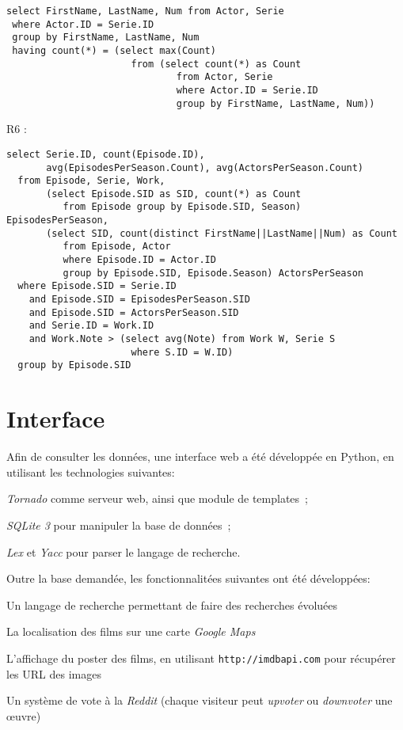 \documentclass[a4paper,12pt]{article}
\begin{document}
\begin{list}{-}{}
\begin{lstlisting}
select FirstName, LastName, Num from Actor, Serie
 where Actor.ID = Serie.ID
 group by FirstName, LastName, Num
 having count(*) = (select max(Count)
                      from (select count(*) as Count
                              from Actor, Serie
                              where Actor.ID = Serie.ID
                              group by FirstName, LastName, Num))
    \end{lstlisting}
  \item R6 :
    \begin{lstlisting}
select Serie.ID, count(Episode.ID),
       avg(EpisodesPerSeason.Count), avg(ActorsPerSeason.Count)
  from Episode, Serie, Work,
       (select Episode.SID as SID, count(*) as Count
          from Episode group by Episode.SID, Season) EpisodesPerSeason,
       (select SID, count(distinct FirstName||LastName||Num) as Count
          from Episode, Actor
          where Episode.ID = Actor.ID
          group by Episode.SID, Episode.Season) ActorsPerSeason
  where Episode.SID = Serie.ID
    and Episode.SID = EpisodesPerSeason.SID
    and Episode.SID = ActorsPerSeason.SID
    and Serie.ID = Work.ID
    and Work.Note > (select avg(Note) from Work W, Serie S
                      where S.ID = W.ID)
  group by Episode.SID
\end{lstlisting}
\section{Interface}
Afin de consulter les données, une interface web a été développée en
Python, en utilisant les technologies suivantes:
\begin{list}{-}{}
  \item \emph{Tornado} comme serveur web, ainsi que module de templates~;
  \item \emph{SQLite 3} pour manipuler la base de données~;
  \item \emph{Lex} et \emph{Yacc} pour parser le langage de recherche.
\end{list}

Outre la base demandée, les fonctionnalitées suivantes ont été développées:
\begin{list}{-}{}
  \item Un langage de recherche permettant de faire des recherches évoluées
  \item La localisation des films sur une carte \emph{Google Maps}
  \item L'affichage du poster des films, en utilisant
    \texttt{http://imdbapi.com} pour récupérer les URL des images
  \item Un système de vote à la \emph{Reddit} (chaque visiteur peut
    \emph{upvoter} ou \emph{downvoter} une œuvre)
\end{list}

\end{list}
\end{document}
